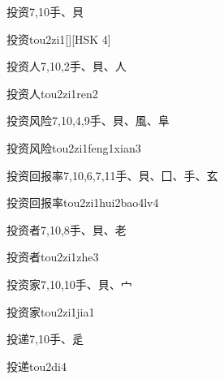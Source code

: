 \begin{entry}{投资}{7,10}{⼿、⾙}
  \begin{phonetics}{投资}{tou2zi1}[][HSK 4]
  \end{phonetics}
\end{entry}

\begin{entry}{投资人}{7,10,2}{⼿、⾙、⼈}
  \begin{phonetics}{投资人}{tou2zi1ren2}
  \end{phonetics}
\end{entry}

\begin{entry}{投资风险}{7,10,4,9}{⼿、⾙、⾵、⾩}
  \begin{phonetics}{投资风险}{tou2zi1feng1xian3}
  \end{phonetics}
\end{entry}

\begin{entry}{投资回报率}{7,10,6,7,11}{⼿、⾙、⼞、⼿、⽞}
  \begin{phonetics}{投资回报率}{tou2zi1hui2bao4lv4}
  \end{phonetics}
\end{entry}

\begin{entry}{投资者}{7,10,8}{⼿、⾙、⽼}
  \begin{phonetics}{投资者}{tou2zi1zhe3}
  \end{phonetics}
\end{entry}

\begin{entry}{投资家}{7,10,10}{⼿、⾙、⼧}
  \begin{phonetics}{投资家}{tou2zi1jia1}
  \end{phonetics}
\end{entry}

\begin{entry}{投递}{7,10}{⼿、⾡}
  \begin{phonetics}{投递}{tou2di4}
  \end{phonetics}
\end{entry}

